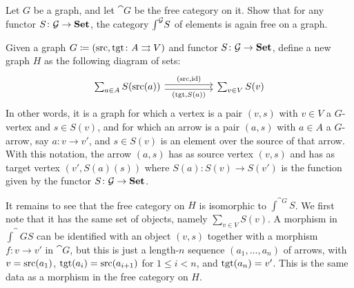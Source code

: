 \documentclass[Book-Poly]{subfiles}
\begin{document}
\begin{exercise}\label{exc.elts_free_grph}
Let $G$ be a graph, and let $\cat{G}$ be the free category on it. Show that for any functor $S\colon\mathcal{G}\to\mathbf{Set}$, the category $\textstyle{\int}^{\mathcal{G}} S$ of elements is again free on a graph.
\begin{solution}
Given a graph $G\coloneqq(\mathrm{src},\mathrm{tgt}\colon A\rightrightarrows V)$ and functor $S\colon\mathcal{G}\to\mathbf{Set}$, define a new graph $H$ as the following diagram of sets:
\[
\begin{tikzcd}[column sep=50pt]
	\sum_{a\in A} S(\fun{src}(a))\ar[r, shift left, "{(\fun{src},\id)}"]\ar[r, shift right, "{(\fun{\tgt},S(a))}"']&
	\sum_{v\in V} S(v)
\end{tikzcd}
\]
In other words, it is a graph for which a vertex is a pair $(v,s)$ with $v\in V$ a $G$-vertex and $s\in S(v)$, and for which an arrow is a pair $(a, s)$ with $a\in A$ a $G$-arrow, say $a\colon v\to v'$, and $s\in S(v)$ is an element over the source of that arrow. With this notation, the arrow $(a,s)$ has as source vertex $(v,s)$ and has as target vertex $(v',S(a)(s))$ where $S(a)\colon S(v)\to S(v')$ is the function given by the functor $S\colon\mathcal{G}\to\mathbf{Set}$.

It remains to see that the free category on $H$ is isomorphic to $\int^{\cat{G}}S$. We first note that it has the same set of objects, namely $\sum_{v\in V}S(v)$. A morphism in $\int^\cat{G}S$ can be identified with an object $(v,s)$ together with a morphism $f\colon v\to v'$ in $\cat{G}$, but this is just a length-$n$ sequence $(a_1,\ldots,a_n)$ of arrows, with $v=\mathrm{src}(a_1)$, $\mathrm{tgt}(a_{i})=\mathrm{src}(a_{i+1})$ for $1\leq i<n$, and $\mathrm{tgt}(a_n)=v'$. This is the same data as a morphism in the free category on $H$.
\end{solution}
\end{exercise}
\end{document}
